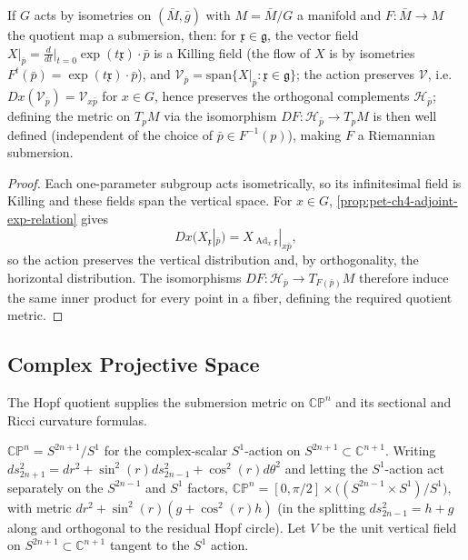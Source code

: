 \begin{proposition}
  \label{prop:pet-ch4-group-action-submersion}

  If $G$ acts by isometries on $(\bar M,\bar g)$ with $M=\bar M/G$ a manifold
  and $F:\bar M\to M$ the quotient map a submersion, then: for
  $\mathfrak x\in\mathfrak g$, the vector field
  $X|_{\bar p}=\tfrac{d}{dt}\big|_{t=0}\exp(t\mathfrak x)\cdot\bar p$ is a
  Killing field (the flow of $X$ is by isometries $F^t(\bar p)=\exp(t\mathfrak x)\cdot\bar p$),
  and $\mathcal V_{\bar p}=\mathrm{span}\{X|_{\bar p}:\mathfrak x\in\mathfrak g\}$;
  the action preserves $\mathcal V$, i.e.\ $Dx(\mathcal V_{\bar p})=\mathcal V_{x\bar p}$
  for $x\in G$, hence preserves the orthogonal complements $\mathcal H_{\bar p}$;
  defining the metric on $T_pM$ via the isomorphism $DF:\mathcal H_{\bar p}\to T_pM$
  is then well defined (independent of the choice of $\bar p\in F^{-1}(p)$),
  making $F$ a Riemannian submersion.
\end{proposition}
\begin{proof}
  \sketch
  Each one-parameter subgroup acts isometrically, so its infinitesimal field is
  Killing and these fields span the vertical space. For $x\in G$,
  \cref{prop:pet-ch4-adjoint-exp-relation} gives
  \[
    Dx(X_{\mathfrak x}|_{\bar p})
    =X_{\operatorname{Ad}_x\mathfrak x}|_{x\bar p},
  \]
  so the action preserves the vertical distribution and, by orthogonality, the
  horizontal distribution. The isomorphisms
  $DF:\mathcal H_{\bar p}\to T_{F(\bar p)}M$ therefore induce the same inner
  product for every point in a fiber, defining the required quotient metric.
\end{proof}


\subsection{Complex Projective Space}

The Hopf quotient supplies the submersion metric on $\mathbb{CP}^n$ and its
sectional and Ricci curvature formulas.

\begin{definition}
  \label{def:pet-ch4-cpn-submersion-setup}

  $\mathbb{CP}^n=S^{2n+1}/S^1$ for the complex-scalar $S^1$-action on
  $S^{2n+1}\subset\mathbb{C}^{n+1}$. Writing
  $ds_{2n+1}^2=dr^2+\sin^2(r)ds_{2n-1}^2+\cos^2(r)d\theta^2$ and letting the
  $S^1$-action act separately on the $S^{2n-1}$ and $S^1$ factors,
  $\mathbb{CP}^n=[0,\pi/2]\times\big((S^{2n-1}\times S^1)/S^1\big)$, with metric
  $dr^2+\sin^2(r)(g+\cos^2(r)h)$ (in the splitting $ds_{2n-1}^2=h+g$ along and
  orthogonal to the residual Hopf circle). Let $V$ be the unit vertical field
  on $S^{2n+1}\subset\mathbb{C}^{n+1}$ tangent to the $S^1$ action.
\end{definition}

